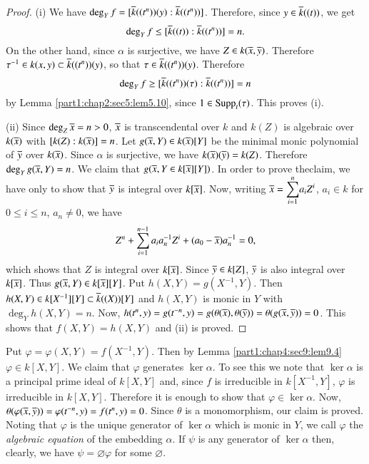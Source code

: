 \begin{proof}
  (i) We have $\deg_Y f = [\overline{k} ((t^n)) (y) : \overline{k}((t^n))]$. Therefore, since $y \in \overline{k} ((t))$, we get
$$
\deg_Y f\leq [\overline{k}((t)): \overline{k} ((t^n))] =n.
$$
On the other hand, since $\alpha$ is surjective, we have $Z \in k (\overline{x}, \overline{y})$. Therefore $\tau^{-1} \in k(x, y) \subset \overline{k} ((t^n)) (y)$, so that $\tau \in \overline{k} ((t^n)) (y)$. Therefore
$$
\deg_Y f \geq [\overline{k} ((t^n)) (\tau): \overline{k} ((t^n))]=n
$$
by Lemma \ref{part1:chap2:sec5:lem5.10}, since $1 \in \operatorname{Supp}_t(\tau)$. This proves (i).

(ii) Since $\deg_Z \overline{x} = n > 0$, $\overline{x}$ is transcendental over $k$ and $k(Z)$ is algebraic over $k(\overline{x})$ with $[k(Z): k(\overline{x})]=n$. Let $g(\overline{x}, Y) \in k (\overline{x}) [Y]$ be the minimal monic polynomial of $\overline{y}$ over $k (\overline{x})$. Since $\alpha$ is surjective, we have $k(\overline{x}) (\overline{y})= k(Z)$. Therefore $\deg_Y g(\overline{x}, Y)=n$. We claim that $g(\overline{x}, Y \in k [\overline{x}][Y])$. In order to prove the\pageoriginale claim, we have only to show that $\overline{y}$ is integral over $k[\overline{x}]$. Now, writing $\overline{x} = \displaystyle{\sum^n_{i=1}} a_i Z^i$, $a_i \in k$ for $0 \leq i \leq n$, $a_n \neq 0$, we have
$$
Z^n + \sum^{n-1}_{i=1} a_i a_n^{-1} Z^i + (a_0 - \overline{x}) a^{-1}_{n}=0,
$$
which shows that $Z$ is integral over $k[\overline{x}]$. Since $\overline{y} \in k [Z]$, $\overline{y}$ is also integral over $k[\overline{x}]$. Thus $g(\overline{x}, Y) \in k[\overline{x}][Y]$. Put $h(X, Y)= g(X^{-1}, Y)$. Then $h(X, Y) \in k[X^{-1}][Y] \subset \overline{k} ((X))[Y]$ and $h(X, Y)$ is monic in $Y$ with $\deg_Y h(X, Y)=n$. Now, $h(t^n, y)= g(t^{-n}, y)= g(\theta (\overline{x}), \theta (\overline{y}))= \theta (g (\overline{x}, \overline{y}))=0$. This shows that $f(X, Y)= h(X, Y)$ and (ii) is proved.
\end{proof}

\begin{remark}\label{part1:chap4:sec9:rem9.5}
  Put $\varphi = \varphi (X, Y)= f(X^{-1}, Y)$. Then by Lemma \ref{part1:chap4:sec9:lem9.4} $\varphi \in k [X, Y]$. We claim that $\varphi$ generates $\ker \alpha$. To see this we note that $\ker \alpha$ is a principal prime ideal of $k[X, Y]$ and, since $f$ is irreducible in $k [X^{-1}, Y]$, $\varphi$ is irreducible in $k [X, Y]$. Therefore it is enough to show that $\varphi \in \ker \alpha$. Now, $\theta (\varphi(\overline{x}, \overline{y}))= \varphi (t^{-n}, y) = f(t^n, y)=0$. Since $\theta$ is a monomorphism, our claim is proved. Noting that $\varphi$ is the unique generator of $\ker \alpha$ which is monic in $Y$, we call $\varphi$ the {\em algebraic equation} of the  embedding $\alpha$. If $\psi$ is any generator of $\ker \alpha$ then, clearly, we have $\psi = \diameter \varphi$ for some $\diameter$.
\end{remark}

